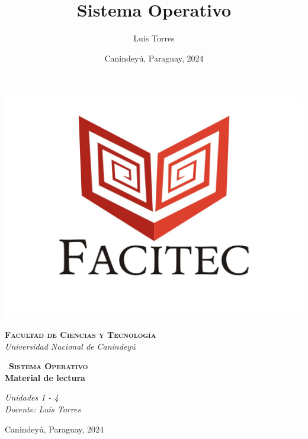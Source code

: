 \documentclass[11pt]{report}
\begin{document}
	
	\title{Sistema Operativo}
	\author{Luis Torres}
	\date{Canindeyú, Paraguay, 2024}
	
	\begin{titlepage}
		\begin{center}
			\includegraphics[width=0.3\linewidth]{Imagenes/facitecLogo1.jpg}
			\vspace{15pt}
			
			{\scshape\LARGE\textbf{Facultad de Ciencias y Tecnología}\\}
			{\Large\itshape Universidad Nacional de Canindeyú\\}
			
			\vspace{1cm}
			{\huge\scshape\ \textbf{Sistema Operativo}\\}
			\vspace{1cm}
			{\huge\bfseries Material de lectura\\}
			
			{\Large\itshape Unidades 1 - 4\\}
			\vspace{1cm}
			{\Large\itshape Docente: Luis Torres\\}
			
			\vfill
			\vfill
			
			{\large Canindeyú, Paraguay, 2024\\}
		\end{center}
	\end{titlepage}
	
	\newpage
	
	\begin{singlespacing}
		\tableofcontents
	\end{singlespacing}
	
	
	
	
	
		
	
	
	
	
\end{document}
